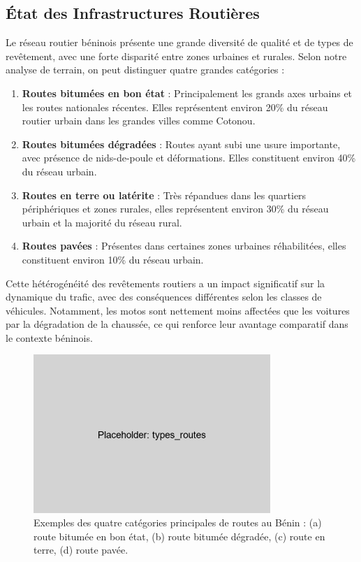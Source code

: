 \subsection{État des Infrastructures Routières}
\label{subsec:etat_infrastructures}

Le réseau routier béninois présente une grande diversité de qualité et de types de revêtement, avec une forte disparité entre zones urbaines et rurales. Selon notre analyse de terrain, on peut distinguer quatre grandes catégories :

\begin{enumerate}
\item \textbf{Routes bitumées en bon état} : Principalement les grands axes urbains et les routes nationales récentes. Elles représentent environ 20\% du réseau routier urbain dans les grandes villes comme Cotonou.

\item \textbf{Routes bitumées dégradées} : Routes ayant subi une usure importante, avec présence de nids-de-poule et déformations. Elles constituent environ 40\% du réseau urbain.

\item \textbf{Routes en terre ou latérite} : Très répandues dans les quartiers périphériques et zones rurales, elles représentent environ 30\% du réseau urbain et la majorité du réseau rural.

\item \textbf{Routes pavées} : Présentes dans certaines zones urbaines réhabilitées, elles constituent environ 10\% du réseau urbain.
\end{enumerate}

Cette hétérogénéité des revêtements routiers a un impact significatif sur la dynamique du trafic, avec des conséquences différentes selon les classes de véhicules. Notamment, les motos sont nettement moins affectées que les voitures par la dégradation de la chaussée, ce qui renforce leur avantage comparatif dans le contexte béninois.

\begin{figure}[htbp]
\centering
\includegraphics[width=0.8\textwidth]{images/specificites_benin/types_routes}
\caption{Exemples des quatre catégories principales de routes au Bénin : (a) route bitumée en bon état, (b) route bitumée dégradée, (c) route en terre, (d) route pavée.}
\label{fig:types_routes}
\end{figure}

